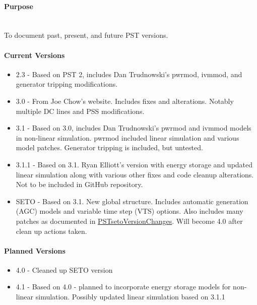 \documentclass[12pt]{article}
\begin{document}
\onehalfspacing
\raggedright
\paragraph{Purpose} \ \\
To document past, present, and future PST versions.

\paragraph{Current Versions}
\begin{itemize}
\item 2.3 - Based on PST 2, includes Dan Trudnowski's pwrmod, ivmmod, and generator tripping modifications.
\item 3.0 - From Joe Chow's website. 
Includes fixes and alterations. 
Notably multiple DC lines and PSS modifications.
\item 3.1 - Based on 3.0, includes Dan Trudnowski's pwrmod and ivmmod models in non-linear simulation. 
pwrmod included linear simulation and various model patches. 
Generator tripping is included, but untested.
\item 3.1.1 - Based on 3.1. Ryan Elliott's version with energy storage and updated linear simulation along with various other fixes and code cleanup alterations. 
Not to be included in GitHub repository.
\item SETO - Based on 3.1. New global structure. 
Includes automatic generation (AGC) models and variable time step (VTS) options. 
Also includes many patches as documented in 
\href{https://github.com/thadhaines/MT-Tech-SETO/tree/master/researchDocs/TEX/one-offs/200709-PSTsetoVersionChanges}{PSTsetoVersionChanges}. 
% 
Will become 4.0 after clean up actions taken.
\end{itemize}

\paragraph{Planned Versions}
\begin{itemize}
\item 4.0 - Cleaned up SETO version 
\item 4.1 - Based on 4.0 - planned to incorporate energy storage models for non-linear simulation. Possibly updated linear simulation based on 3.1.1
\end{itemize}
\end{document}
